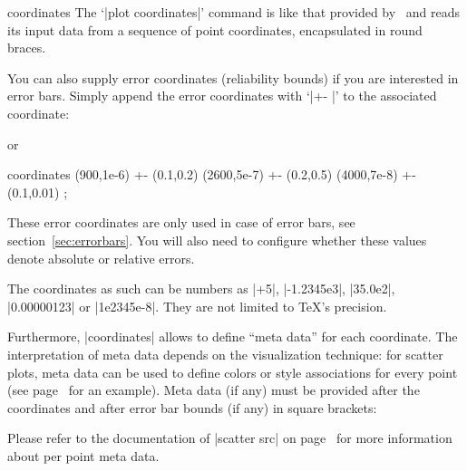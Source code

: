 \begin{addplotoperation}[]{coordinates}{}
\label{pgfplots:addplot:coordinates}
The `|plot coordinates|' command is like that provided by \Tikz\ and reads its input data from a sequence of point coordinates, encapsulated in round braces.
\begin{codeexample}[]
\end{codeexample}

You can also supply error coordinates (reliability bounds) if you are interested in error bars. Simply append the error coordinates with `|+- |' to the associated coordinate:
\begin{codeexample}[]
\end{codeexample}
or 
\begin{codeexample}
\addplot coordinates {
	 (900,1e-6) +- (0.1,0.2)
	(2600,5e-7) +- (0.2,0.5)
	(4000,7e-8) +- (0.1,0.01)
};
\end{codeexample}
These error coordinates are only used in case of error bars, see section~\ref{sec:errorbars}. You will also need to configure whether these values denote absolute or relative errors.

The coordinates as such can be numbers as |+5|, |-1.2345e3|, |35.0e2|, |0.00000123| or |1e2345e-8|. They are not limited to \TeX's precision.

Furthermore, |coordinates| allows to define ``meta data'' for each coordinate. The interpretation of meta data depends on the visualization technique: for scatter plots, meta data can be used to define colors or style associations for every point (see page~\pageref{pgfplots:scatterclasses} for an example). Meta data (if any) must be provided after the coordinates and after error bar bounds (if any) in square brackets:
\begin{codeexample}[]
\end{codeexample}
Please refer to the documentation of |scatter src| on page~\pageref{pgfplots:scatter:src} for more information about per point meta data.
\end{addplotoperation}

